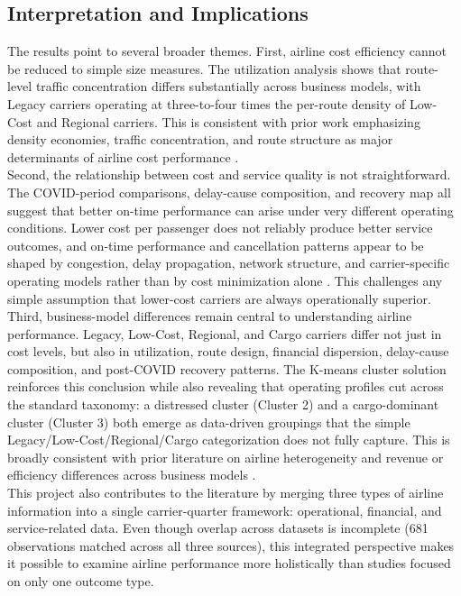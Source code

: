 \documentclass[11pt, letterpaper]{article}
\begin{document}
\subsection{Interpretation and Implications}
The results point to several broader themes. First, airline cost efficiency cannot be reduced to simple size measures. The utilization analysis shows that route-level traffic concentration differs substantially across business models, with Legacy carriers operating at three-to-four times the per-route density of Low-Cost and Regional carriers. This is consistent with prior work emphasizing density economies, traffic concentration, and route structure as major determinants of airline cost performance \cite{Banker1993,Caves1984,Li2025,Zuidberg2014}.\\
\indent Second, the relationship between cost and service quality is not straightforward. The COVID-period comparisons, delay-cause composition, and recovery map all suggest that better on-time performance can arise under very different operating conditions. Lower cost per passenger does not reliably produce better service outcomes, and on-time performance and cancellation patterns appear to be shaped by congestion, delay propagation, network structure, and carrier-specific operating models rather than by cost minimization alone \cite{Lee2023,MayerSinai2002}. This challenges any simple assumption that lower-cost carriers are always operationally superior.\\
\indent Third, business-model differences remain central to understanding airline performance. Legacy, Low-Cost, Regional, and Cargo carriers differ not just in cost levels, but also in utilization, route design, financial dispersion, delay-cause composition, and post-COVID recovery patterns. The K-means cluster solution reinforces this conclusion while also revealing that operating profiles cut across the standard taxonomy: a distressed cluster (Cluster 2) and a cargo-dominant cluster (Cluster 3) both emerge as data-driven groupings that the simple Legacy/Low-Cost/Regional/Cargo categorization does not fully capture. This is broadly consistent with prior literature on airline heterogeneity and revenue or efficiency differences across business models \cite{Barbot2008,Gillen2005,Kaya2023,Li2025,Nguyen2022}.\\
\indent This project also contributes to the literature by merging three types of airline information into a single carrier-quarter framework: operational, financial, and service-related data. Even though overlap across datasets is incomplete (681 observations matched across all three sources), this integrated perspective makes it possible to examine airline performance more holistically than studies focused on only one outcome type.\\
\end{document}
